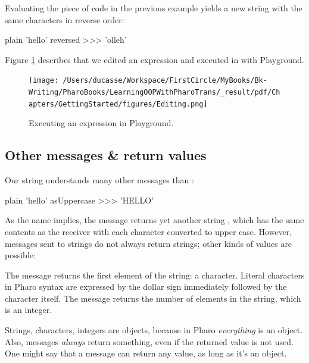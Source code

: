 \documentclass[10pt,twoside,english]{_support/latex/sbabook/sbabook}
\begin{document}
Evaluating the piece of code in the previous example yields a new string with the same characters in reverse order:

\begin{displaycode}{plain}
'hello' reversed
>>> 'olleh'
\end{displaycode}

Figure \ref{fig:Editing} describes that we edited an expression and executed in with Playground. 


\begin{figure}

\begin{center}
\texttt{[image: /Users/ducasse/Workspace/FirstCircle/MyBooks/Bk-Writing/PharoBooks/LearningOOPWithPharoTrans/\_result/pdf/Chapters/GettingStarted/figures/Editing.png]}\caption{Executing an expression in Playground.\label{fig:Editing}}\end{center}
\end{figure}

\subsection{Other messages \& return values}
Our  string understands many other messages than :

\begin{displaycode}{plain}
'hello' asUppercase
>>> 'HELLO'
\end{displaycode}

As the name implies, the  message returns yet another string , which has the same contents as the receiver with each character converted to upper case.
However, messages sent to strings do not always return strings; other kinds of values are possible:


The message  returns the first element of the string: a character.
Literal characters in Pharo syntax are expressed by the dollar sign \textcode{\$} immediately followed by the character itself.
The message  returns the number of elements in the string, which is an integer.

Strings, characters, integers are objects, because in Pharo \textit{everything} is an object.
Also, messages \textit{always} return something, even if the returned value is not used.
One might say that a message can return any value, as long as it's an object.
\end{document}
